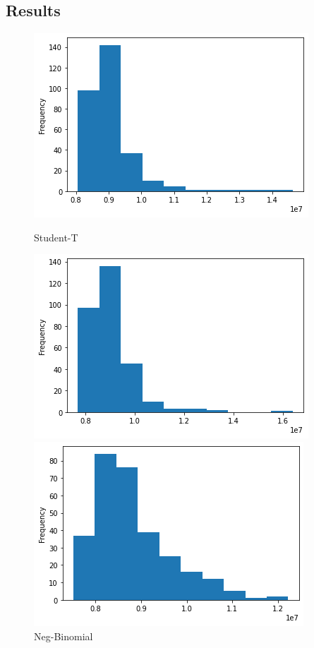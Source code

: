 \subsection{Results}
\begin{figure}[htb]
  \centering
  \includegraphics[width=\linewidth]{./img/histogram_deepar_electricity_statistics_300_samples.png}
  \caption{Student-T}
  \label{fig:deepar_student_t_distibution}
  \endminipage\hfill
  \includegraphics[width=\linewidth]{./img/histogram_deepar_negbin_electricity_statistics_200_samples.png}
  \caption{Neg-Binomial}
  \label{fig:deepar_negbinomial_distibution}
  \endminipage\hfill
  \includegraphics[width=\linewidth]{./img/histogram_deepar_poisson_electricity_statistics_200_samples.png}

\end{figure}
